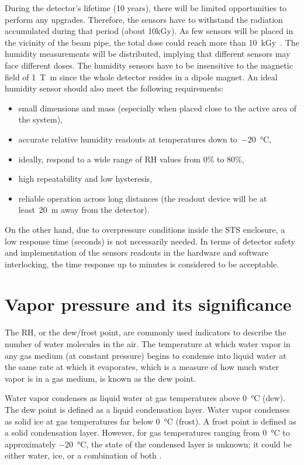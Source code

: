 During the detector's lifetime (10 years), there will be limited opportunities to perform any upgrades. Therefore, the sensors have to withstand the radiation accumulated during that period (about 10kGy). As few sensors will be placed in the vicinity of the beam pipe, the total dose could reach more than 10~kGy~\cite{Heuser:54798}. The humidity measurements will be distributed, implying that different sensors may face different doses. 
The humidity sensors have to be insensitive to the magnetic field of \SI{1}{\tesla\metre} since the whole detector resides in a dipole magnet.  An ideal humidity sensor should also meet the following requirements:
\begin{itemize}
    \item small dimensions and mass (especially when placed close to the active area of the system),
    \item accurate relative humidity readouts at temperatures down to~\SI{-20}{\celsius}, 
    \item ideally, respond to a wide range of \gls{RH} values from 0\% to 80\%,
    \item high repeatability and low hysteresis,
    \item reliable operation across long distances (the readout device will be at least~\SI{20}{\metre} away from the detector).
\end{itemize}

On the other hand, due to overpressure conditions inside the \gls{STS} enclosure, a low response time (seconds) is not necessarily needed. In terms of detector safety and implementation of the sensors readouts in the hardware and software interlocking, the time response up to minutes is considered to be acceptable. 

\section{Vapor pressure and its significance}

The \gls{RH}, or the dew/frost point, are commonly used indicators to describe the number of water molecules in the air. The temperature at which water vapor in any gas medium (at constant pressure) begins to condense into liquid water at the same rate at which it evaporates, which is a measure of how much water vapor is in a gas medium, is known as the dew point.

Water vapor condenses as liquid water at gas temperatures above \SI{0}{\celsius} (dew). The dew point is defined as a liquid condensation layer. Water vapor condenses as solid ice at gas temperatures far below \SI{0}{\celsius} (frost). A frost point is defined as a solid condensation layer. However, for gas temperatures ranging from \SI{0}{\celsius} to approximately \SI{-20}{\celsius}, the state of the condensed layer is unknown; it could be either water, ice, or a combination of both \cite{nie_dewpoint}. 


